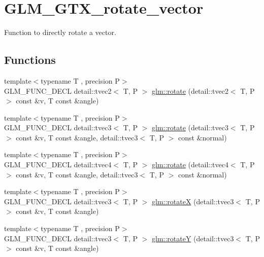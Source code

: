 \hypertarget{group__gtx__rotate__vector}{}\section{G\+L\+M\+\_\+\+G\+T\+X\+\_\+rotate\+\_\+vector}
\label{group__gtx__rotate__vector}


Function to directly rotate a vector.  


\subsection*{Functions}
\begin{DoxyCompactItemize}
\item 
{\footnotesize template$<$typename T , precision P$>$ }\\G\+L\+M\+\_\+\+F\+U\+N\+C\+\_\+\+D\+E\+CL detail\+::tvec2$<$ T, P $>$ \hyperlink{group__gtx__rotate__vector_ga5520f6dd671807ec62a8f97c00c1b78b}{glm\+::rotate} (detail\+::tvec2$<$ T, P $>$ const \&v, T const \&angle)
\item 
{\footnotesize template$<$typename T , precision P$>$ }\\G\+L\+M\+\_\+\+F\+U\+N\+C\+\_\+\+D\+E\+CL detail\+::tvec3$<$ T, P $>$ \hyperlink{group__gtx__rotate__vector_ga4eccdf3769ce3b5d1e4018394290f88c}{glm\+::rotate} (detail\+::tvec3$<$ T, P $>$ const \&v, T const \&angle, detail\+::tvec3$<$ T, P $>$ const \&normal)
\item 
{\footnotesize template$<$typename T , precision P$>$ }\\G\+L\+M\+\_\+\+F\+U\+N\+C\+\_\+\+D\+E\+CL detail\+::tvec4$<$ T, P $>$ \hyperlink{group__gtx__rotate__vector_gac4abb6be47bd14303d6eded41f2f65f1}{glm\+::rotate} (detail\+::tvec4$<$ T, P $>$ const \&v, T const \&angle, detail\+::tvec3$<$ T, P $>$ const \&normal)
\item 
{\footnotesize template$<$typename T , precision P$>$ }\\G\+L\+M\+\_\+\+F\+U\+N\+C\+\_\+\+D\+E\+CL detail\+::tvec3$<$ T, P $>$ \hyperlink{group__gtx__rotate__vector_gadb69cdc8ea08715c9d8a74f587cf0eac}{glm\+::rotateX} (detail\+::tvec3$<$ T, P $>$ const \&v, T const \&angle)
\item 
{\footnotesize template$<$typename T , precision P$>$ }\\G\+L\+M\+\_\+\+F\+U\+N\+C\+\_\+\+D\+E\+CL detail\+::tvec3$<$ T, P $>$ \hyperlink{group__gtx__rotate__vector_gae1e673b7a464218ce6a5e8f02145f877}{glm\+::rotateY} (detail\+::tvec3$<$ T, P $>$ const \&v, T const \&angle)

\end{DoxyCompactItemize}
